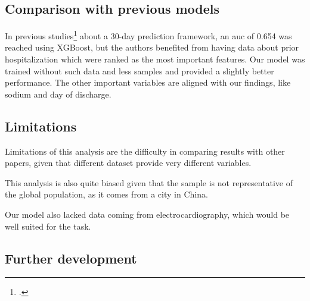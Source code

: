 


\subsection{Comparison with previous models}

In previous studies\footcite{Sharma2022Predicting} about a 30-day prediction framework, an \gls{auc} of 0.654 was reached using XGBoost, but the authors benefited from having data about prior hospitalization which were ranked as the most important features. Our model was trained without such data and less samples and provided a slightly better performance. The other important variables are aligned with our findings, like sodium and day of discharge.

\subsection{Limitations}

Limitations of this analysis are the difficulty in comparing results with other papers, given that different dataset provide very different variables.

This analysis is also quite biased given that the sample is not representative of the global population, as it comes from a city in China.

Our model also lacked data coming from electrocardiography, which would be well suited for the task.

\subsection{Further development}

